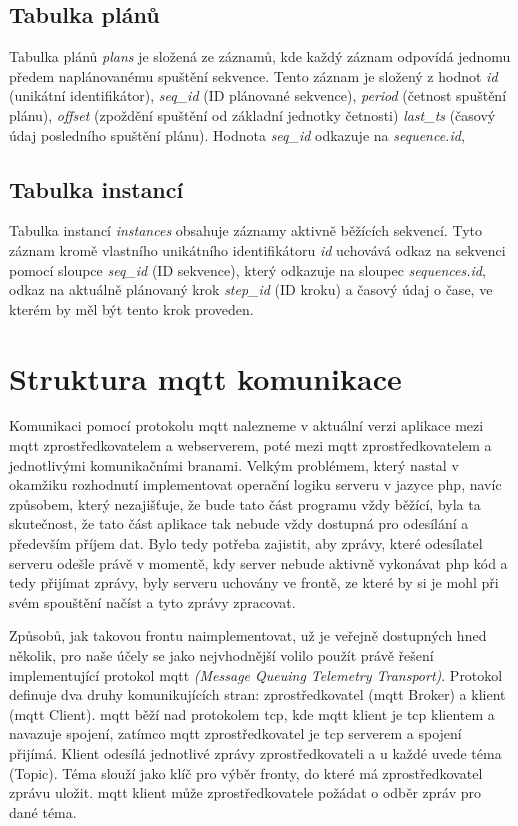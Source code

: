 \subsection{Tabulka plánů}

Tabulka plánů \emph{plans} je složená ze záznamů, kde každý záznam odpovídá jednomu předem naplánovanému spuštění sekvence. Tento záznam je složený z hodnot \emph{id} (unikátní identifikátor), \emph{seq\_id} (ID plánované sekvence), \emph{period} (četnost spuštění plánu), \emph{offset} (zpoždění spuštění od základní jednotky četnosti) \emph{last\_ts} (časový údaj posledního spuštění plánu). Hodnota \emph{seq\_id} odkazuje na \emph{sequence.id}, 

\subsection{Tabulka instancí}

Tabulka instancí \emph{instances} obsahuje záznamy aktivně běžících sekvencí. Tyto záznam kromě vlastního unikátního identifikátoru \emph{id} uchovává odkaz na sekvenci pomocí sloupce \emph{seq\_id} (ID sekvence), který odkazuje na sloupec \emph{sequences.id}, odkaz na aktuálně plánovaný krok \emph{step\_id} (ID kroku) a časový údaj o čase, ve kterém by měl být tento krok proveden.

\section{Struktura \acrshort{mqtt} komunikace}

Komunikaci pomocí protokolu \acrshort{mqtt} nalezneme v aktuální verzi aplikace mezi \acrshort{mqtt} zprostředkovatelem a webserverem, poté mezi \acrshort{mqtt} zprostředkovatelem a jednotlivými komunikačními branami. Velkým problémem, který nastal v okamžiku rozhodnutí implementovat operační logiku serveru v jazyce \acrshort{php}, navíc způsobem, který nezajišťuje, že bude tato část programu vždy běžící, byla ta skutečnost, že tato část aplikace tak nebude vždy dostupná pro odesílání a především příjem dat. Bylo tedy potřeba zajistit, aby zprávy, které odesílatel serveru odešle právě v momentě, kdy server nebude aktivně vykonávat \acrshort{php} kód a tedy přijímat zprávy, byly serveru uchovány ve frontě, ze které by si je mohl při svém spouštění načíst a tyto zprávy zpracovat.

Způsobů, jak takovou frontu naimplementovat, už je veřejně dostupných hned několik, pro naše účely se jako nejvhodnější volilo použít právě řešení implementující protokol \acrshort{mqtt} \emph{(Message Queuing Telemetry Transport)}. Protokol definuje dva druhy komunikujících stran: zprostředkovatel (\acrshort{mqtt} Broker) a klient (\acrshort{mqtt} Client). \acrshort{mqtt} běží nad protokolem \acrshort{tcp}, kde \acrshort{mqtt} klient je \acrshort{tcp} klientem a navazuje spojení, zatímco \acrshort{mqtt} zprostředkovatel je \acrshort{tcp} serverem a spojení přijímá. Klient odesílá jednotlivé zprávy zprostředkovateli a u každé uvede téma (Topic). Téma slouží jako klíč pro výběr fronty, do které má zprostředkovatel zprávu uložit. \acrshort{mqtt} klient může zprostředkovatele požádat o odběr zpráv pro dané téma.

